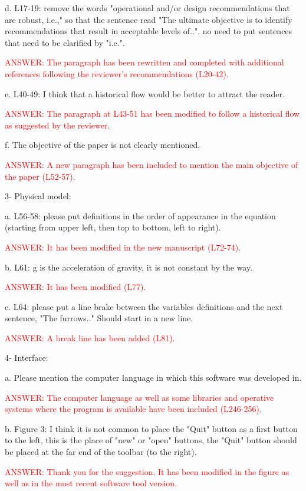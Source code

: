 \documentclass[a4paper]{article}
\begin{document}
d. L17-19: remove the words "operational and/or design recommendations that are robust, i.e.," so that the sentence read "The ultimate objective is to identify recommendations that result in acceptable levels of..". no need to put sentences that need to be clarified by "i.e.".

\textcolor{red}{ANSWER: The paragraph has been rewritten and completed with
additional references following the reviewer's recommendations (L20-42).}

e. L40-49: I think that a historical flow would be better to attract the reader.

\textcolor{red}{ANSWER: The paragraph at L43-51 has been modified to follow a historical
flow as suggested by the reviewer.}

f. The objective of the paper is not clearly mentioned.

\textcolor{red}{ANSWER: A new paragraph has been included to mention the
main objective of the paper (L52-57).}

3- Physical model:

a. L56-58: please put definitions in the order of appearance in the equation (starting from upper left, then top to bottom, left to right).

\textcolor{red}{ANSWER: It has been modified in the new manuscript
(L72-74).}

b. L61: g is the acceleration of gravity, it is not constant by the way.

\textcolor{red}{ANSWER: It has been modified (L77).}

c. L64: please put a line brake between the variables definitions and the next sentence, "The furrows.." Should start in a new line.

\textcolor{red}{ANSWER: A break line has been added (L81).}

4- Interface:

a. Please mention the computer language in which this software was developed in.

\textcolor{red}{ANSWER: The computer language as well as some libraries and
operative systems where the program is available have been included (L246-256).}

b. Figure 3: I think it is not common to place the "Quit" button as a first button to the left, this is the place of "new" or "open" buttons, the "Quit" button should be placed at the far end of the toolbar (to the right).

\textcolor{red}{ANSWER: Thank you for the suggestion. It has been modified in
the figure as well as in the most recent software tool version.}
\end{document}
